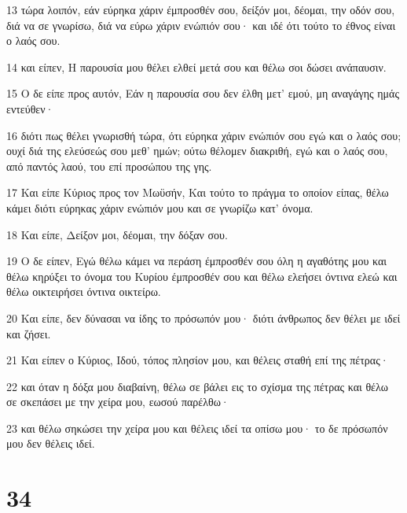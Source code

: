 \par 13 τώρα λοιπόν, εάν εύρηκα χάριν έμπροσθέν σου, δείξόν μοι, δέομαι, την οδόν σου, διά να σε γνωρίσω, διά να εύρω χάριν ενώπιόν σου· και ιδέ ότι τούτο το έθνος είναι ο λαός σου.
\par 14 και είπεν, Η παρουσία μου θέλει ελθεί μετά σου και θέλω σοι δώσει ανάπαυσιν.
\par 15 Ο δε είπε προς αυτόν, Εάν η παρουσία σου δεν έλθη μετ' εμού, μη αναγάγης ημάς εντεύθεν·
\par 16 διότι πως θέλει γνωρισθή τώρα, ότι εύρηκα χάριν ενώπιόν σου εγώ και ο λαός σου; ουχί διά της ελεύσεώς σου μεθ' ημών; ούτω θέλομεν διακριθή, εγώ και ο λαός σου, από παντός λαού, του επί προσώπου της γης.
\par 17 Και είπε Κύριος προς τον Μωϋσήν, Και τούτο το πράγμα το οποίον είπας, θέλω κάμει διότι εύρηκας χάριν ενώπιόν μου και σε γνωρίζω κατ' όνομα.
\par 18 Και είπε, Δείξον μοι, δέομαι, την δόξαν σου.
\par 19 Ο δε είπεν, Εγώ θέλω κάμει να περάση έμπροσθέν σου όλη η αγαθότης μου και θέλω κηρύξει το όνομα του Κυρίου έμπροσθέν σου και θέλω ελεήσει όντινα ελεώ και θέλω οικτειρήσει όντινα οικτείρω.
\par 20 Και είπε, δεν δύνασαι να ίδης το πρόσωπόν μου· διότι άνθρωπος δεν θέλει με ιδεί και ζήσει.
\par 21 Και είπεν ο Κύριος, Ιδού, τόπος πλησίον μου, και θέλεις σταθή επί της πέτρας·
\par 22 και όταν η δόξα μου διαβαίνη, θέλω σε βάλει εις το σχίσμα της πέτρας και θέλω σε σκεπάσει με την χείρα μου, εωσού παρέλθω·
\par 23 και θέλω σηκώσει την χείρα μου και θέλεις ιδεί τα οπίσω μου· το δε πρόσωπόν μου δεν θέλεις ιδεί.

\chapter{34}

